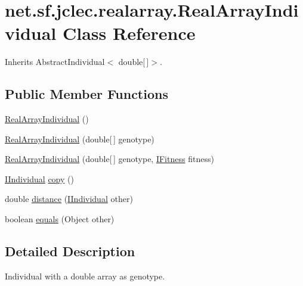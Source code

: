\hypertarget{classnet_1_1sf_1_1jclec_1_1realarray_1_1_real_array_individual}{\section{net.\-sf.\-jclec.\-realarray.\-Real\-Array\-Individual Class Reference}
\label{classnet_1_1sf_1_1jclec_1_1realarray_1_1_real_array_individual}
}


Inherits Abstract\-Individual$<$ double\mbox{[}$\,$\mbox{]}$>$.

\subsection*{Public Member Functions}
\begin{DoxyCompactItemize}
\item 
\hyperlink{classnet_1_1sf_1_1jclec_1_1realarray_1_1_real_array_individual_a728e0459e21fc3424f78e14a7f9810cd}{Real\-Array\-Individual} ()
\item 
\hyperlink{classnet_1_1sf_1_1jclec_1_1realarray_1_1_real_array_individual_ae1e0445fc904b0a6ab9868480492544f}{Real\-Array\-Individual} (double\mbox{[}$\,$\mbox{]} genotype)
\item 
\hyperlink{classnet_1_1sf_1_1jclec_1_1realarray_1_1_real_array_individual_a05409ee219d4a5c597fa6dde9a00b584}{Real\-Array\-Individual} (double\mbox{[}$\,$\mbox{]} genotype, \hyperlink{interfacenet_1_1sf_1_1jclec_1_1_i_fitness}{I\-Fitness} fitness)
\item 
\hyperlink{interfacenet_1_1sf_1_1jclec_1_1_i_individual}{I\-Individual} \hyperlink{classnet_1_1sf_1_1jclec_1_1realarray_1_1_real_array_individual_a835f69e680c392d141b34cc655bee8cf}{copy} ()
\item 
double \hyperlink{classnet_1_1sf_1_1jclec_1_1realarray_1_1_real_array_individual_a718daf7e1ad679e3d9c3d866616b2ba7}{distance} (\hyperlink{interfacenet_1_1sf_1_1jclec_1_1_i_individual}{I\-Individual} other)
\item 
boolean \hyperlink{classnet_1_1sf_1_1jclec_1_1realarray_1_1_real_array_individual_ab9fbde76c01acd9769a130f813c4c5bf}{equals} (Object other)
\end{DoxyCompactItemize}


\subsection{Detailed Description}
Individual with a double array as genotype.

